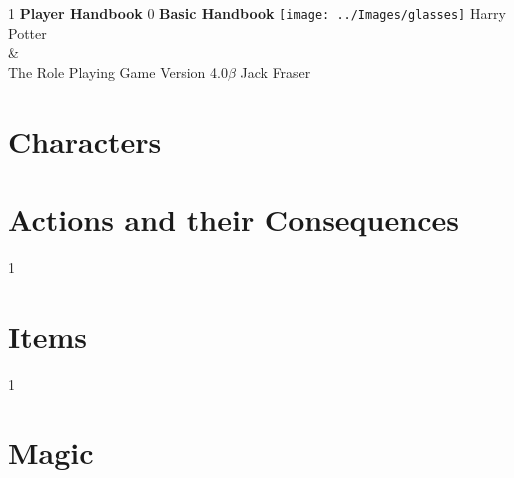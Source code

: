 \documentclass[oneside, twocolumn,9pt,english]{extbook}
\def\coreMode{1}
\newcommand*\cleartoleftpage{%
  \clearpage
  \ifodd\value{page}\hbox{}\clearpage\fi
}
\begin{document}
\begin{titlepage}
    \centering
    \vfill
    \if\coreMode1
    {\bfseries
        {\HP \fontsize{40}{35}\selectfont Player Handbook}
    }    
    \fi
    \if\coreMode0
    {\bfseries
        {\HP \fontsize{40}{35}\selectfont Basic Handbook}
    } 
    \fi
    \vfill
    \texttt{[image: ../Images/glasses]} %
    \vfill
    {\HP \fontsize{30}{24} \selectfont  Harry Potter \\\&\\ The Role Playing Game}
    \normalsize
    \vfill
    {\HP \fontsize{22}{0} \selectfont Version 4.0$\beta$ \hfill Jack Fraser}
\end{titlepage}

\setcounter{tocdepth}{0}  
\begin{spacing}{0.8}
\footnotesize
\tableofcontents
\normalsize
\end{spacing}


\cleartoleftpage
\part{Characters} \label{C:CharacterCreation}


%



\cleartoleftpage
\part{Actions and their Consequences}





\if\coreMode1	
	
\fi
\part{Items}


\if \coreMode1
	
\fi

\cleartoleftpage
\part{Magic}


\end{document}
